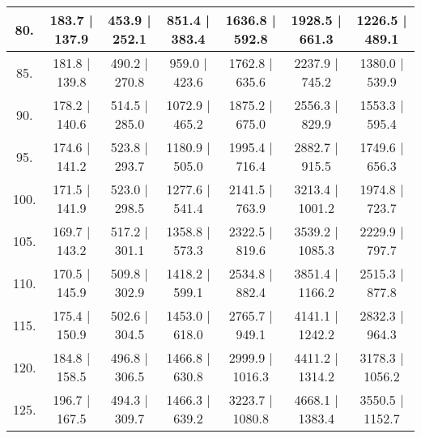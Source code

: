 \begin{tabular}{|c||c|c|c|c|c|c|}
\hline
  80. &    183.7 |   137.9 &    453.9 |   252.1 &    851.4 |   383.4 &   1636.8 |   592.8 &   1928.5 |   661.3 &   1226.5 |   489.1\tabularnewline
\hline
  85. &    181.8 |   139.8 &    490.2 |   270.8 &    959.0 |   423.6 &   1762.8 |   635.6 &   2237.9 |   745.2 &   1380.0 |   539.9\tabularnewline
\hline
  90. &    178.2 |   140.6 &    514.5 |   285.0 &   1072.9 |   465.2 &   1875.2 |   675.0 &   2556.3 |   829.9 &   1553.3 |   595.4\tabularnewline
\hline
  95. &    174.6 |   141.2 &    523.8 |   293.7 &   1180.9 |   505.0 &   1995.4 |   716.4 &   2882.7 |   915.5 &   1749.6 |   656.3\tabularnewline
\hline
 100. &    171.5 |   141.9 &    523.0 |   298.5 &   1277.6 |   541.4 &   2141.5 |   763.9 &   3213.4 |  1001.2 &   1974.8 |   723.7\tabularnewline
\hline
 105. &    169.7 |   143.2 &    517.2 |   301.1 &   1358.8 |   573.3 &   2322.5 |   819.6 &   3539.2 |  1085.3 &   2229.9 |   797.7\tabularnewline
\hline
 110. &    170.5 |   145.9 &    509.8 |   302.9 &   1418.2 |   599.1 &   2534.8 |   882.4 &   3851.4 |  1166.2 &   2515.3 |   877.8\tabularnewline
\hline
 115. &    175.4 |   150.9 &    502.6 |   304.5 &   1453.0 |   618.0 &   2765.7 |   949.1 &   4141.1 |  1242.2 &   2832.3 |   964.3\tabularnewline
\hline
 120. &    184.8 |   158.5 &    496.8 |   306.5 &   1466.8 |   630.8 &   2999.9 |  1016.3 &   4411.2 |  1314.2 &   3178.3 |  1056.2\tabularnewline
\hline
 125. &    196.7 |   167.5 &    494.3 |   309.7 &   1466.3 |   639.2 &   3223.7 |  1080.8 &   4668.1 |  1383.4 &   3550.5 |  1152.7\tabularnewline
\hline
\end{tabular}
